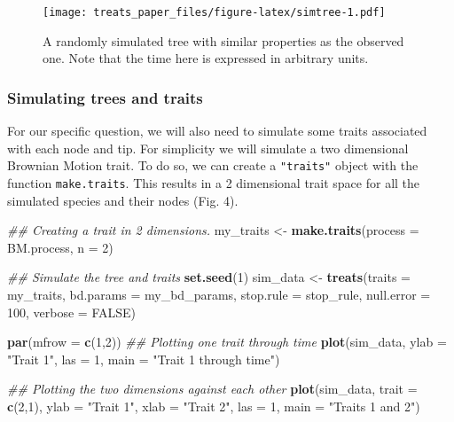 \documentclass[
]{article}
\newenvironment{Shaded}{\begin{snugshade}}{\end{snugshade}}
\newcommand{\CommentTok}[1]{\textcolor[rgb]{0.56,0.35,0.01}{\textit{#1}}}
\newcommand{\DataTypeTok}[1]{\textcolor[rgb]{0.13,0.29,0.53}{#1}}
\newcommand{\DecValTok}[1]{\textcolor[rgb]{0.00,0.00,0.81}{#1}}
\newcommand{\KeywordTok}[1]{\textcolor[rgb]{0.13,0.29,0.53}{\textbf{#1}}}
\newcommand{\NormalTok}[1]{#1}
\newcommand{\OtherTok}[1]{\textcolor[rgb]{0.56,0.35,0.01}{#1}}
\newcommand{\StringTok}[1]{\textcolor[rgb]{0.31,0.60,0.02}{#1}}
\begin{document}
\begin{figure}
\centering
\texttt{[image: treats\_paper\_files/figure-latex/simtree-1.pdf]}
\caption{A randomly simulated tree with similar properties as the
observed one. Note that the time here is expressed in arbitrary units.}
\end{figure}

\hypertarget{simulating-trees-and-traits}{%
\subsubsection{Simulating trees and
traits}\label{simulating-trees-and-traits}}

For our specific question, we will also need to simulate some traits
associated with each node and tip. For simplicity we will simulate a two
dimensional Brownian Motion trait. To do so, we can create a
\texttt{"traits"} object with the function \texttt{make.traits}. This
results in a 2 dimensional trait space for all the simulated species and
their nodes (Fig. 4).

\begin{Shaded}
\begin{Highlighting}[]
\CommentTok{\#\# Creating a trait in 2 dimensions.}
\NormalTok{my\_traits \textless{}{-}}\StringTok{ }\KeywordTok{make.traits}\NormalTok{(}\DataTypeTok{process =}\NormalTok{ BM.process, }\DataTypeTok{n =} \DecValTok{2}\NormalTok{)}

\CommentTok{\#\# Simulate the tree and traits}
\KeywordTok{set.seed}\NormalTok{(}\DecValTok{1}\NormalTok{)}
\NormalTok{sim\_data \textless{}{-}}\StringTok{ }\KeywordTok{treats}\NormalTok{(}\DataTypeTok{traits     =}\NormalTok{ my\_traits,}
                   \DataTypeTok{bd.params  =}\NormalTok{ my\_bd\_params,}
                   \DataTypeTok{stop.rule  =}\NormalTok{ stop\_rule,}
                   \DataTypeTok{null.error =} \DecValTok{100}\NormalTok{,}
                   \DataTypeTok{verbose    =} \OtherTok{FALSE}\NormalTok{)}
\end{Highlighting}
\end{Shaded}

\begin{Shaded}
\begin{Highlighting}[]
\KeywordTok{par}\NormalTok{(}\DataTypeTok{mfrow =} \KeywordTok{c}\NormalTok{(}\DecValTok{1}\NormalTok{,}\DecValTok{2}\NormalTok{))}
\CommentTok{\#\# Plotting one trait through time}
\KeywordTok{plot}\NormalTok{(sim\_data, }\DataTypeTok{ylab =} \StringTok{"Trait 1"}\NormalTok{, }\DataTypeTok{las =} \DecValTok{1}\NormalTok{, }\DataTypeTok{main =} \StringTok{"Trait 1 through time"}\NormalTok{)}

\CommentTok{\#\# Plotting the two dimensions against each other}
\KeywordTok{plot}\NormalTok{(sim\_data, }\DataTypeTok{trait =} \KeywordTok{c}\NormalTok{(}\DecValTok{2}\NormalTok{,}\DecValTok{1}\NormalTok{), }\DataTypeTok{ylab =} \StringTok{"Trait 1"}\NormalTok{, }\DataTypeTok{xlab =} \StringTok{"Trait 2"}\NormalTok{, }\DataTypeTok{las =} \DecValTok{1}\NormalTok{, }\DataTypeTok{main =} \StringTok{"Traits 1 and 2"}\NormalTok{)}
\end{Highlighting}
\end{Shaded}
\end{document}
